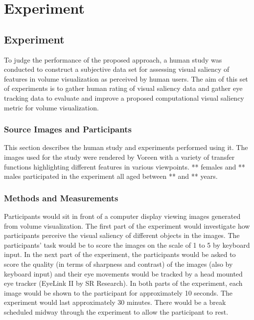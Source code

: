 \chapter{Experiment}

\section{Experiment}
To judge the performance of the proposed approach, a human study was conducted to construct a subjective data set for assessing visual saliency of features in volume visualization as perceived by human users. The aim of this set of experiments is to gather human rating of visual saliency data and gather eye tracking data to evaluate and improve a proposed computational visual saliency metric for volume visualization.

\subsection{Source Images and Participants}
This section describes the human study and experiments performed using it.
The images used for the study were rendered by Voreen \cite{meyer-spradow_voreen:_2009} with a variety of transfer functions highlighting different features in various viewpoints.
** females and ** males participated in the experiment all aged between ** and ** years.

\subsection{Methods and Measurements}
Participants would sit in front of a computer display viewing images generated from volume visualization. The first part of the experiment would investigate how participants perceive the visual saliency of different objects in the images. The participants’ task would be to score the images on the scale of 1 to 5 by keyboard input. In the next part of the experiment, the participants would be asked to score the quality (in terms of sharpness and contrast) of the images (also by keyboard input) and their eye movements would be tracked by a head mounted eye tracker (EyeLink II by SR Research). In both parts of the experiment, each image would be shown to the participant for approximately 10 seconds. The experiment would last approximately 30 minutes. There would be a break scheduled midway through the experiment to allow the participant to rest.


